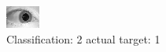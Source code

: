 \begin{figure}[h!]
\begin{center}
\includegraphics[width=0.60\columnwidth]{figures/ID1502_class_2_target_1.png}
\end{center}
\caption{ Classification: 2 actual target: 1}
\label{fig:ID1502_class_2_target_1}
\end{figure}
